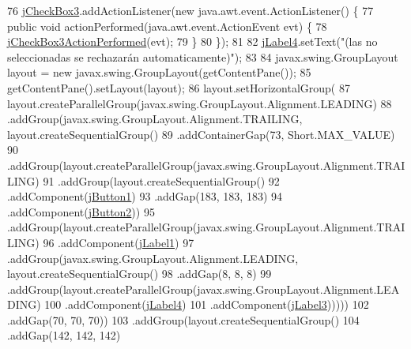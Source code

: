 \begin{DoxyCode}
76         \mbox{\hyperlink{classsoftware_1_1_aceptar_peticiones_a7b914f4724640bc95273e5119651f9a7}{jCheckBox3}}.addActionListener(\textcolor{keyword}{new} java.awt.event.ActionListener() \{
77             \textcolor{keyword}{public} \textcolor{keywordtype}{void} actionPerformed(java.awt.event.ActionEvent evt) \{
78                 \mbox{\hyperlink{classsoftware_1_1_aceptar_peticiones_a62c8bfdd7cd94d40d2629a094e2e5252}{jCheckBox3ActionPerformed}}(evt);
79             \}
80         \});
81 
82         \mbox{\hyperlink{classsoftware_1_1_aceptar_peticiones_ae9e89fa13ccf9f0b425175204554f58c}{jLabel4}}.setText(\textcolor{stringliteral}{"(las no seleccionadas se rechazarán automaticamente)"});
83 
84         javax.swing.GroupLayout layout = \textcolor{keyword}{new} javax.swing.GroupLayout(getContentPane());
85         getContentPane().setLayout(layout);
86         layout.setHorizontalGroup(
87             layout.createParallelGroup(javax.swing.GroupLayout.Alignment.LEADING)
88             .addGroup(javax.swing.GroupLayout.Alignment.TRAILING, layout.createSequentialGroup()
89                 .addContainerGap(73, Short.MAX\_VALUE)
90                 .addGroup(layout.createParallelGroup(javax.swing.GroupLayout.Alignment.TRAILING)
91                     .addGroup(layout.createSequentialGroup()
92                         .addComponent(\mbox{\hyperlink{classsoftware_1_1_aceptar_peticiones_a0dbb46cb648a55e144e5334959c9a068}{jButton1}})
93                         .addGap(183, 183, 183)
94                         .addComponent(\mbox{\hyperlink{classsoftware_1_1_aceptar_peticiones_ac78871be271223b0cf33bcee93b44687}{jButton2}}))
95                     .addGroup(layout.createParallelGroup(javax.swing.GroupLayout.Alignment.TRAILING)
96                         .addComponent(\mbox{\hyperlink{classsoftware_1_1_aceptar_peticiones_a4678a7287858835aca98294897b6e05c}{jLabel1}})
97                         .addGroup(javax.swing.GroupLayout.Alignment.LEADING, layout.createSequentialGroup()
98                             .addGap(8, 8, 8)
99                             .addGroup(layout.createParallelGroup(javax.swing.GroupLayout.Alignment.LEADING)
100                                 .addComponent(\mbox{\hyperlink{classsoftware_1_1_aceptar_peticiones_ae9e89fa13ccf9f0b425175204554f58c}{jLabel4}})
101                                 .addComponent(\mbox{\hyperlink{classsoftware_1_1_aceptar_peticiones_af8e9b26223cf00481a430c6780ffef22}{jLabel3}})))))
102                 .addGap(70, 70, 70))
103             .addGroup(layout.createSequentialGroup()
104                 .addGap(142, 142, 142)

\end{DoxyCode}
